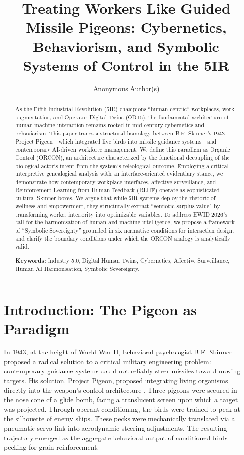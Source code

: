 \documentclass[11pt, a4paper]{article}
\title{Treating Workers Like Guided Missile Pigeons: Cybernetics, Behaviorism, and Symbolic Systems of Control in the 5IR}
\author{Anonymous Author(s)}
\affil{Submission for HWID 2026}
\date{}
\begin{document}
\maketitle

\begin{abstract}
As the Fifth Industrial Revolution (5IR) champions ``human-centric'' workplaces, work augmentation, and Operator Digital Twins (ODTs), the fundamental architecture of human-machine interaction remains rooted in mid-century cybernetics and behaviorism. This paper traces a structural homology between B.F. Skinner's 1943 Project Pigeon---which integrated live birds into missile guidance systems---and contemporary AI-driven workforce management. We define this paradigm as Organic Control (ORCON), an architecture characterized by the functional decoupling of the biological actor's intent from the system's teleological outcome. Employing a critical-interpretive genealogical analysis with an interface-oriented evidentiary stance, we demonstrate how contemporary workplace interfaces, affective surveillance, and Reinforcement Learning from Human Feedback (RLHF) operate as sophisticated cultural Skinner boxes. We argue that while 5IR systems deploy the rhetoric of wellness and empowerment, they structurally extract ``semiotic surplus value'' by transforming worker interiority into optimizable variables. To address HWID 2026's call for the harmonisation of human and machine intelligence, we propose a framework of ``Symbolic Sovereignty'' grounded in six normative conditions for interaction design, and clarify the boundary conditions under which the ORCON analogy is analytically valid.

\textbf{Keywords:} Industry 5.0, Digital Human Twins, Cybernetics, Affective Surveillance, Human-AI Harmonisation, Symbolic Sovereignty.
\end{abstract}

\section{Introduction: The Pigeon as Paradigm}

In 1943, at the height of World War II, behavioral psychologist B.F. Skinner proposed a radical solution to a critical military engineering problem: contemporary guidance systems could not reliably steer missiles toward moving targets. His solution, Project Pigeon, proposed integrating living organisms directly into the weapon's control architecture \cite{skinner1960}. Three pigeons were secured in the nose cone of a glide bomb, facing a translucent screen upon which a target was projected. Through operant conditioning, the birds were trained to peck at the silhouette of enemy ships. These pecks were mechanically translated via a pneumatic servo link into aerodynamic steering adjustments. The resulting trajectory emerged as the aggregate behavioral output of conditioned birds pecking for grain reinforcement.
\end{document}
